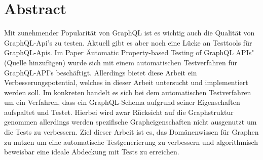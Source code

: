 \chapter{Abstract}

Mit zunehmender Popularität von GraphQL ist es wichtig auch die Qualität von GraphQL-Api's zu testen.
Aktuell gibt es aber noch eine Lücke an Testtools für GraphQL-Apis. Im Paper \"Automatic Property-based Testing of
GraphQL APIs" (Quelle hinzufügen) wurde sich mit einem automatischen Testverfahren für GraphQL-API's beschäftigt.
Allerdings bietet diese Arbeit ein Verbesserungspotential, welches in dieser Arbeit untersucht und implementiert werden soll.
Im konkreten handelt es sich bei dem automatischen Testverfahren um ein Verfahren, dass ein GraphQL-Schema aufgrund seiner
Eigenschaften aufspaltet und Testet. Hierbei wird zwar Rücksicht auf die Graphstruktur genommen allerdings werden spezifische
Grapheigenschaften nicht ausgenutzt um die Tests zu verbessern. Ziel dieser Arbeit ist es, das Domänenwissen für Graphen zu nutzen
um eine automatische Testgenerierung zu verbessern und algorithmisch beweisbar eine ideale Abdeckung mit Tests zu erreichen.